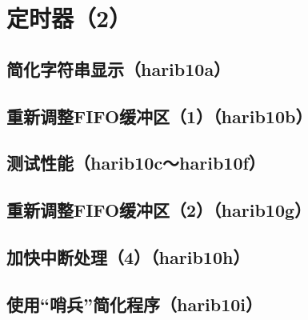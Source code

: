 ﻿\chapter{	定时器（2）	}
\section{	简化字符串显示（harib10a）	}
\section{	重新调整FIFO缓冲区（1）（harib10b）	}
\section{	测试性能（harib10c～harib10f）	}
\section{	重新调整FIFO缓冲区（2）（harib10g）	}
\section{	加快中断处理（4）（harib10h）	}
\section{	使用“哨兵”简化程序（harib10i）	}

